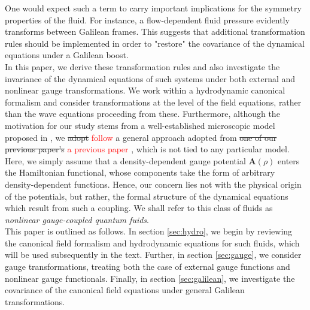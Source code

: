 \documentclass[twocolumn, nofootinbib, nobibnotes, amsmath,amssymb,aps, pra, floatfix]{revtex4-1}
\renewcommand{\v}[1]{\ensuremath{\mathbf{#1}}} %
\begin{document}
One would expect such a term to carry important implications for the symmetry properties of the fluid.
For instance, a flow-dependent fluid pressure evidently transforms between Galilean frames.
This suggests that additional transformation rules should be implemented in order to "restore" the covariance of the dynamical equations under a Galilean boost.\\
In this paper, we derive these transformation rules and also investigate the invariance of the dynamical equations of such systems under both external and nonlinear gauge transformations.
We work within a hydrodynamic canonical formalism and consider transformations at the level of the field equations, rather than the wave equations proceeding from these.
Furthermore, although the motivation for our study stems from a well-established microscopic model proposed in \cite{edmonds2013}, we \sout{adopt} \textcolor{red}{follow} a general approach adopted from \sout{one of our previous paper's} \textcolor{red}{a previous paper} \cite{buggy2020hydrodynamics}, which is not tied to any particular model.
Here, we simply assume that a density-dependent gauge potential $\v{A}\left(\rho\right)$ enters the Hamiltonian functional, whose components take the form of arbitrary density-dependent functions.
Hence, our concern lies not with the physical origin of the potentials, but rather, the formal structure of the dynamical equations which result from such a coupling.
We shall refer to this class of fluids as \textit{nonlinear gauge-coupled quantum fuids}. \\
This paper is outlined as follows.
In section \ref{sec:hydro}, we begin by reviewing the canonical field formalism and hydrodynamic equations for such fluids, which will be used subsequently in the text.
Further, in section \ref{sec:gauge}, we consider gauge transformations, treating both the case of external gauge functions and nonlinear gauge functionals.
Finally, in section \ref{sec:galilean}, we investigate the covariance of the canonical field equations under general Galilean transformations.
\end{document}
